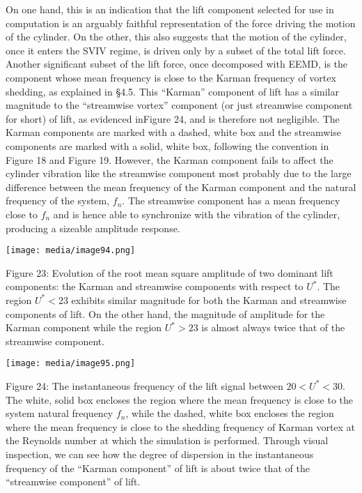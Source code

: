 \documentclass[]{article}
\begin{document}
On one hand, this is an indication that the lift component selected for
use in computation is an arguably faithful representation of the force
driving the motion of the cylinder. On the other, this also suggests
that the motion of the cylinder, once it enters the SVIV regime, is
driven only by a subset of the total lift force. Another significant
subset of the lift force, once decomposed with EEMD, is the component
whose mean frequency is close to the Karman frequency of vortex
shedding, as explained in §4.5. This ``Karman'' component of lift has a
similar magnitude to the ``streamwise vortex'' component (or just
streamwise component for short) of lift, as evidenced inFigure 24, and
is therefore not negligible. The Karman components are marked with a
dashed, white box and the streamwise components are marked with a solid,
white box, following the convention in Figure 18 and Figure 19. However,
the Karman component fails to affect the cylinder vibration like the
streamwise component most probably due to the large difference between
the mean frequency of the Karman component and the natural frequency of
the system, \(f_{n}\). The streamwise component has a mean frequency
close to \(f_{n}\) and is hence able to synchronize with the vibration
of the cylinder, producing a sizeable amplitude response.

\texttt{[image: media/image94.png]}

Figure 23: Evolution of the root mean square amplitude of two dominant
lift components: the Karman and streamwise components with respect to
\(U^{*}\). The region \(U^{*} < 23\) exhibits similar magnitude for both
the Karman and streamwise components of lift. On the other hand, the
magnitude of amplitude for the Karman component while the region
\(U^{*} > 23\) is almost always twice that of the streamwise component.

\texttt{[image: media/image95.png]}

\protect\hypertarget{_Ref41049739}{}{}Figure 24: The instantaneous
frequency of the lift signal between \(20 < U^{*} < 30\). The white,
solid box encloses the region where the mean frequency is close to the
system natural frequency \(f_{n}\), while the dashed, white box encloses
the region where the mean frequency is close to the shedding frequency
of Karman vortex at the Reynolds number at which the simulation is
performed. Through visual inspection, we can see how the degree of
dispersion in the instantaneous frequency of the ``Karman component'' of
lift is about twice that of the ``streamwise component'' of lift.
\end{document}
